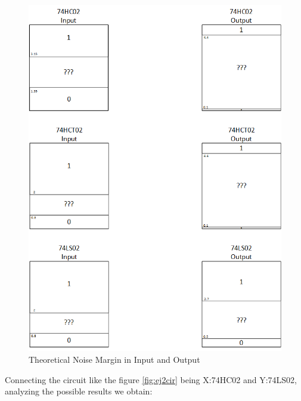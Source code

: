 	 \begin{figure}[h!]
        \centering
        \includegraphics[scale=0.5]{dataaa2.png}
        \caption{\color{cyan}Theoretical Noise Margin in Input and Output}
        \label{fig:ej2thnm}
    \end{figure}
    
    Connecting the circuit like the figure \ref{fig:ej2cir} being X:74HC02 and Y:74LS02, analyzing the possible results we obtain:

